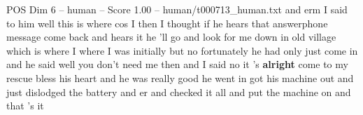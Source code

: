 \begin{textsample}{POS Dim 6 – human – Score 1.00 – human/t000713\_human.txt}  \label{ex:f6_pos_006}
and erm I said to him well this is where cos I then I thought if he hears that answerphone message come back and hears it he 'll go and look for me down in old village which is where I where I was initially but no fortunately he had only just come in and he said well you don't need me then and I said no it 's \textbf{alright} come to my rescue bless his heart and he was really good he went in got his machine out and just dislodged the battery and er and checked it all and put the machine on and that 's it

\end{textsample}
